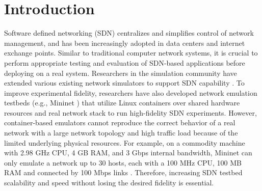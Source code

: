 \section{Introduction}


Software defined networking (SDN) centralizes and simplifies control of network management, and has been increasingly adopted in data centers and internet exchange points\cite{B4, Meridian, SDX}.
Similar to traditional computer network systems, it is crucial to perform appropriate testing and evaluation of SDN-based applications before deploying on a real system.
Researchers in the simulation community have extended various existing network simulators to support SDN capability \cite{S3F, NS3, OPNET}.
To improve experimental fidelity, researchers have also developed network emulation testbeds
(e.g., Mininet \cite{Mininet}) that utilize Linux containers over shared hardware resources and
real network stack to run high-fidelity SDN experiments.
However, container-based emulators cannot reproduce the correct behavior of a real network
with a large network topology and high traffic load because of the limited underlying physical resources.
For example, on a commodity machine with 2.98 GHz CPU, 4 GB RAM, and 3 Gbps internal bandwidth,
Mininet can only emulate a network up to 30 hosts, each with a 100 MHz CPU, 100 MB RAM and connected by 100 Mbps links \cite{ReproNetExprCBE}.
Therefore, increasing SDN testbed scalability and speed without losing the desired fidelity is essential.


